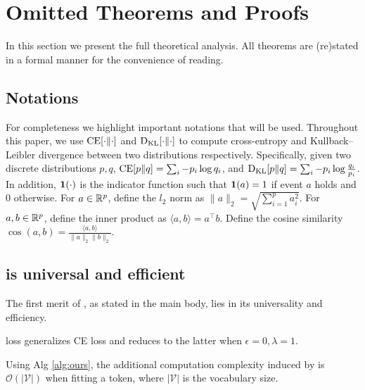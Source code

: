 \clearpage
\onecolumn





\section{Omitted Theorems and Proofs}
\label{app:proof}

In this section we present the full theoretical analysis.
All theorems are (re)stated in a formal manner for the convenience of reading. 

\subsection{Notations}
For completeness we highlight important notations that will be used. 
Throughout this paper, we use $\text{CE}[\cdot \| \cdot]$ and $\text{D}_\text{KL}[\cdot \| \cdot]$ to compute cross-entropy and Kullback–Leibler divergence between two distributions respectively. 
Specifically, given two discrete distributions $p, q$, $\text{CE} [p \| q] 
= \sum_{i} - p_i \log q_i$, and $\text{D}_\text{KL} [p \| q] = \sum_{i} - p_i \log \frac{q_i}{p_i}$.
In addition, $\boldsymbol{1}(\cdot)$ is the indicator function such that $\boldsymbol{1}(a) = 1$ if event $a$ holds and 0 otherwise. 
For $a \in \mathbb{R}^{p}$, define the $l_2$ norm as $\|a\|_2 = \sqrt{\sum_{i =1}^p a_i^2}$.
For $a, b \in \mathbb{R}^{p}$, define the inner product as $\langle a, b \rangle = a ^\top b$.
Define the cosine similarity $\cos(a, b) = \frac{\langle a, b \rangle}{\|a\|_2 \|b\|_2}$.





\subsection{{\NAME} is universal and efficient}

The first merit of {\NAME}, as stated in the main body, lies in its universality and efficiency.

\begin{proposition}
{\NAME} loss generalizes CE loss and reduces to the latter when $\epsilon = 0, \lambda = 1$.
\end{proposition}
% 
\begin{proposition}
Using Alg \ref{alg:ours}, the additional computation complexity induced by {\NAME} is $\mathcal O(|\mathcal V|)$ when fitting a token, where $|\mathcal V|$ is the vocabulary size. 
\end{proposition}


